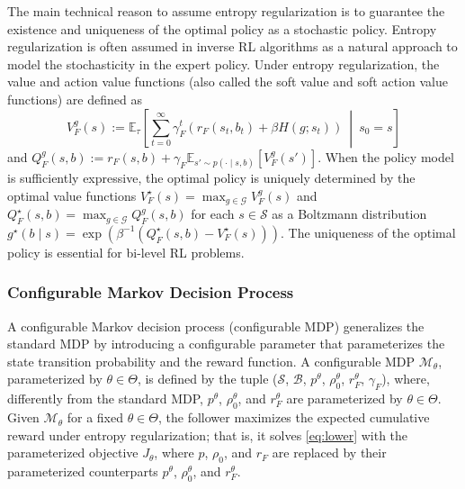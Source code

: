 \documentclass[letterpaper]{article} %
\providecommand{\E}{\mathbb{E}} %
\begin{document}
The main technical reason to assume entropy regularization is to guarantee the existence and uniqueness of the optimal policy as a stochastic policy. Entropy regularization is often assumed in inverse RL algorithms as a natural approach to model the stochasticity in the expert policy.
Under entropy regularization, the value and action value functions (also called the soft value and soft action value functions) are defined as 
\begin{equation*}
    V_F^{g}(s):=\E_\tau\left[\sum_{t=0}^\infty\gamma_F^t \left(r_F(s_t,b_t) + \beta H(g;s_t)\right)~\middle|~s_0=s\right]
\end{equation*}%
and $Q_F^{g}(s,b) := r_F(s, b) + \gamma_F\E_{s' \sim p(\cdot \mid s, b)}[ V_F^{g}(s') ]$.
When the policy model is sufficiently expressive, the optimal policy is uniquely determined by the optimal value functions
$V_F^{\star}(s) = \max_{g\in \mathcal{G}} V_F^{g}(s)$ and $Q_F^{\star}(s,b) = \max_{g\in \mathcal{G}} Q_F^{g}(s, b)$ for each $s \in \mathcal{S}$ as a Boltzmann distribution $g^\star(b \mid s) = \exp \left(\beta^{-1}\left(Q_F^\star(s, b) - V_F^\star(s)\right)\right)$.
The uniqueness of the optimal policy is essential for bi-level RL problems.

\subsubsection{Configurable Markov Decision Process}

A configurable Markov decision process (configurable MDP) generalizes the standard MDP by introducing a configurable parameter that parameterizes the state transition probability and the reward function.
A configurable MDP $\mathcal{M}_{\theta}$, parameterized by ${\theta} \in \Theta$, is defined by the tuple ($\mathcal{S}$, $\mathcal{B}$, $p^{\theta}$, $\rho_0^{\theta}$, $r_F^{\theta}$, $\gamma_F$), where, differently from the standard MDP, $p^{\theta}$, $\rho_0^{\theta}$, and $r_F^{\theta}$ are parameterized by ${\theta} \in \Theta$.
Given $\mathcal{M}_{\theta}$ for a fixed ${\theta} \in \Theta$, the follower maximizes the expected cumulative reward under entropy regularization; that is, it solves \eqref{eq:lower} with the parameterized objective $J_{\theta}$, where $p$, $\rho_0$, and $r_F$ are replaced by their parameterized counterparts $p^{\theta}$, $\rho_0^{\theta}$, and $r_F^{\theta}$.
\end{document}
